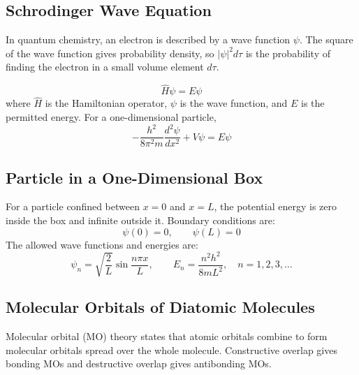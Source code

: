\documentclass[12pt,a4paper]{article}
\begin{document}
\subsection{Schrodinger Wave Equation}
In quantum chemistry, an electron is described by a wave function $\psi$. The square of the wave function gives probability density, so $|\psi|^2 d\tau$ is the probability of finding the electron in a small volume element $d\tau$.

\begin{tcolorbox}[formulabox, title={Time-Independent Schrodinger Equation}]
\[
\hat{H}\psi = E\psi
\]
where $\hat{H}$ is the Hamiltonian operator, $\psi$ is the wave function, and $E$ is the permitted energy. For a one-dimensional particle,
\[
-\frac{h^2}{8\pi^2m}\frac{d^2\psi}{dx^2}+V\psi=E\psi
\]
\end{tcolorbox}

\subsection{Particle in a One-Dimensional Box}
For a particle confined between $x=0$ and $x=L$, the potential energy is zero inside the box and infinite outside it. Boundary conditions are:
\[
\psi(0)=0,\qquad \psi(L)=0
\]
The allowed wave functions and energies are:
\[
\psi_n=\sqrt{\frac{2}{L}}\sin\frac{n\pi x}{L},\qquad E_n=\frac{n^2h^2}{8mL^2},\quad n=1,2,3,\ldots
\]

\begin{tcolorbox}[tikzbox, title={Particle in a Box: Quantized Standing Waves}]
\centering
{}
\end{tcolorbox}

\subsection{Molecular Orbitals of Diatomic Molecules}
Molecular orbital (MO) theory states that atomic orbitals combine to form molecular orbitals spread over the whole molecule. Constructive overlap gives bonding MOs and destructive overlap gives antibonding MOs.
\end{document}
